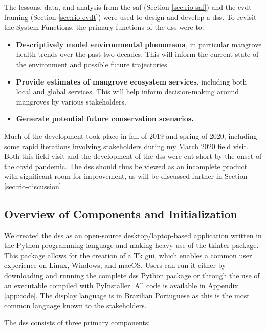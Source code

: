 The lessons, data, and analysis from the \ac{saf} (Section \ref{sec:rio-saf}) and the \ac{evdt} framing (Section \ref{sec:rio-evdt}) were used to design and develop a \acf{dss}. To revisit the System Functions, the primary functions of the \ac{dss} were to:

\begin{itemize}[itemsep=0pt,parsep=0pt]
    \item{\textbf{Descriptively model environmental phenomena}, in particular mangrove health trends over the past two decades. This will inform the current state of the environment and possible future trajectories.}
    \item{\textbf{Provide estimates of mangrove ecosystem services}, including both local and global services. This will help inform decision-making around mangroves by various stakeholders.}
    \item{\textbf{Generate potential future conservation scenarios.}}
\end{itemize}

Much of the development took place in fall of 2019 and spring of 2020, including some rapid iterations involving stakeholders during my March 2020 field visit. Both this field visit and the development of the \ac{dss} were cut short by the onset of the \ac{covid} pandemic. The \ac{dss} should thus be viewed as an incomplete product with significant room for improvement, as will be discussed further in Section \ref{sec:rio-discussion}.

\subsection{Overview of Components and Initialization}

We created the \ac{dss} as an open-source desktop/laptop-based application written in the Python programming language and making heavy use of the tkinter package. This package allows for the creation of a Tk \ac{gui}, which enables a common user experience on Linux, Windows, and macOS. Users can run it either by downloading and running the complete \ac{dss} Python package or through the use of an executable compiled with PyInstaller. All code is available in Appendix \ref{app:code}. The display language is in Brazilian Portuguese as this is the most common language known to the stakeholders.

The \ac{dss} consists of three primary components:

